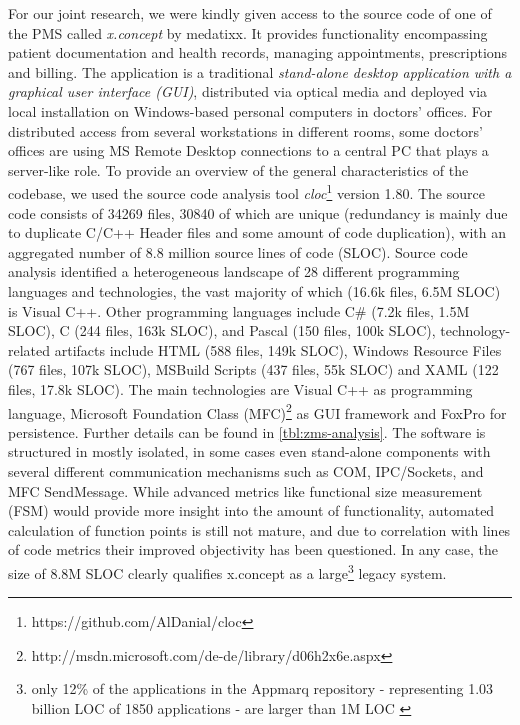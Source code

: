 For our joint research, we were kindly given access to the source code of one of the PMS called \emph{x.concept} by medatixx.
It provides functionality encompassing patient documentation and health records, managing appointments, prescriptions and billing.
The application is a traditional \emph{stand-alone desktop application with a graphical user interface (GUI)}, distributed via optical media and deployed via local installation on Windows-based personal computers in doctors' offices.
For distributed access from several workstations in different rooms, some doctors' offices are using MS Remote Desktop connections to a central PC that plays a server-like role.
To provide an overview of the general characteristics of the codebase, we used the source code analysis tool \emph{cloc}\footnote{https://github.com/AlDanial/cloc} version 1.80.
The source code consists of 34269 files, 30840 of which are unique (redundancy is mainly due to duplicate C/C++ Header files and some amount of code duplication), with an aggregated number of 8.8 million source lines of code (SLOC).
Source code analysis identified a heterogeneous landscape of 28 different programming languages and technologies, the vast majority of which (16.6k files, 6.5M SLOC) is Visual C++.
Other programming languages include C\# (7.2k files, 1.5M SLOC), C (244 files, 163k SLOC), and Pascal (150 files, 100k SLOC), technology-related artifacts include HTML (588 files, 149k SLOC), Windows Resource Files (767 files, 107k SLOC), MSBuild Scripts (437 files, 55k SLOC) and XAML (122 files, 17.8k SLOC).
The main technologies are Visual C++ as programming language, Microsoft Foundation Class (MFC)\footnote{http://msdn.microsoft.com/de-de/library/d06h2x6e.aspx} as GUI framework and FoxPro for persistence.
Further details can be found in \cref{tbl:zms-analysis}.
The software is structured in mostly isolated, in some cases even stand-alone components with several different communication mechanisms such as COM, IPC/Sockets, and MFC SendMessage.
While advanced metrics like functional size measurement (FSM) \autocite{ISO/IEC2009FSM} would provide more insight into the amount of functionality, automated calculation of function points is still not mature, and due to correlation with lines of code metrics \autocite{Albrecht1983FP} their improved objectivity has been questioned.
In any case, the size of 8.8M SLOC clearly qualifies x.concept as a large\footnote{only 12\% of the applications in the Appmarq repository - representing 1.03 billion LOC of 1850 applications - are larger than 1M LOC \autocite{CAST2017}} legacy system.

